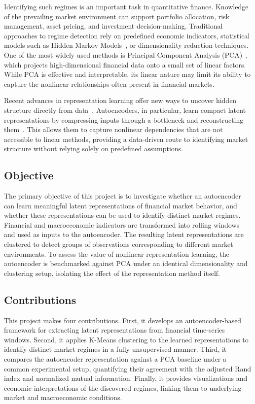 \documentclass[conference]{IEEEtran}
\begin{document}
Identifying such regimes is an important task in quantitative finance.
Knowledge of the prevailing market environment can support portfolio
allocation, risk management, asset pricing, and investment decision-making.
Traditional approaches to regime detection rely on predefined economic
indicators, statistical models such as Hidden Markov Models~\cite{hamilton1989new,ang2002regime}, or dimensionality
reduction techniques. One of the most widely used methods is Principal Component
Analysis (PCA)~\cite{stock2002forecasting}, which projects high-dimensional financial data onto a small set
of linear factors. While PCA is effective and interpretable, its linear nature
may limit its ability to capture the nonlinear relationships often present in
financial markets.

Recent advances in representation learning offer new ways to uncover hidden
structure directly from data~\cite{bengio2013representation}. Autoencoders, in particular, learn compact latent
representations by compressing inputs through a bottleneck and reconstructing
them~\cite{hinton2006reducing,rumelhart1986learning}. This allows them to capture nonlinear dependencies that are not accessible
to linear methods, providing a data-driven route to identifying market
structure without relying solely on predefined assumptions.

\subsection{Objective}

The primary objective of this project is to investigate whether an autoencoder
can learn meaningful latent representations of financial market behavior, and
whether these representations can be used to identify distinct market regimes.
Financial and macroeconomic indicators are transformed into rolling windows and
used as inputs to the autoencoder. The resulting latent representations are
clustered to detect groups of observations corresponding to different market
environments. To assess the value of nonlinear representation learning, the
autoencoder is benchmarked against PCA under an identical dimensionality and
clustering setup, isolating the effect of the representation method itself.

\subsection{Contributions}

This project makes four contributions. First, it develops an autoencoder-based
framework for extracting latent representations from financial time-series
windows. Second, it applies K-Means clustering to the learned representations to
identify distinct market regimes in a fully unsupervised manner. Third, it
compares the autoencoder representation against a PCA baseline under a common
experimental setup, quantifying their agreement with the adjusted Rand index and
normalized mutual information. Finally, it provides visualizations and economic
interpretations of the discovered regimes, linking them to underlying market and
macroeconomic conditions.
\end{document}
